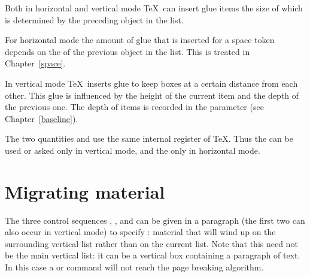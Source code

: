 \documentclass{book}
\begin{document}
Both in horizontal and vertical mode
\TeX\ can insert glue items the size of which is
determined by the preceding object in the list.

For horizontal mode the amount of glue that is inserted
for a space token depends on the  of
the previous object in the list. This is treated
in Chapter~\ref{space}.

In vertical mode \TeX\ inserts glue to keep boxes at a certain
distance from each other. This glue is influenced by the
height of the current item and the depth of the previous one.
The depth of items is recorded in the  parameter
(see Chapter~\ref{baseline}).

The two quantities  
and  
use the same internal register of \TeX. Thus the 
can be used or asked only in vertical mode, and the 
only in horizontal mode.

\section{Migrating material}
\label{migrate}

The three control sequences , , and 
can be given in a paragraph 
(the first two can also occur
in vertical mode) to specify :
material that will wind up on the
surrounding vertical list rather than on the current list.
Note that this need not be 
the main vertical list: it can be a vertical box
containing a paragraph of text. In this case a 
or  command will not reach the page breaking algorithm.
\end{document}
